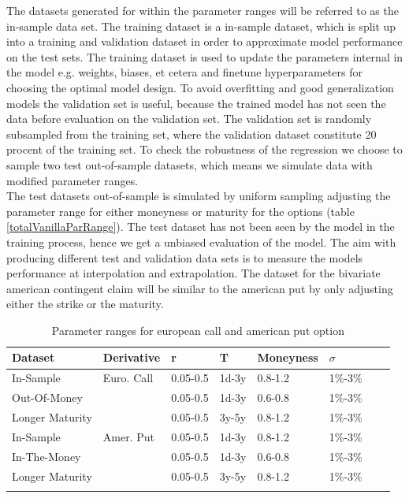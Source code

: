 The datasets generated for within the parameter ranges will be referred to as the in-sample data set. The training dataset is a in-sample dataset, which is split up into a training and validation dataset in order to approximate model performance on the test sets. The training dataset is used to update the parameters internal in the model e.g. weights, biases, et cetera and finetune hyperparameters for choosing the optimal model design. To avoid overfitting and good generalization models the validation set is useful, because the trained model has not seen the data before evaluation on the validation set. The validation set is randomly subsampled from the training set, where the validation dataset constitute 20 procent of the training set. To check the robustness of the regression we choose to sample two test out-of-sample datasets, which means we simulate data with modified parameter ranges. \\

The test datasets out-of-sample is simulated by uniform sampling adjusting the parameter range for either moneyness or maturity for the options (table \ref{totalVanillaParRange}). The test dataset has not been seen by the model in the training process, hence we get a unbiased evaluation of the model. The aim with producing different test and validation data sets is to measure the models performance at interpolation and extrapolation. The dataset for the bivariate american contingent claim will be similar to the american put by only adjusting either the strike or the maturity.\\

\begin{table}[th]
\caption{Parameter ranges for european call and american put option}
\label{tab:totalVanillaParRange}
\centering
\begin{tabular}{l l l l l l l l }
\toprule
\textbf{Dataset} & Derivative  & \textbf{r} & \textbf{T} & \textbf{Moneyness} & \textbf{$\sigma$} \\
\midrule
In-Sample & Euro. Call & 0.05-0.5 & 1d-3y & 0.8-1.2 & 1\%-3\%\\ 
Out-Of-Money & & 0.05-0.5 & 1d-3y & 0.6-0.8 & 1\%-3\%\\
Longer Maturity & & 0.05-0.5 & 3y-5y & 0.8-1.2 & 1\%-3\%\\
In-Sample & Amer. Put & 0.05-0.5 & 1d-3y & 0.8-1.2 & 1\%-3\%\\ 
In-The-Money & & 0.05-0.5 & 1d-3y & 0.6-0.8 & 1\%-3\%\\
Longer Maturity & & 0.05-0.5 & 3y-5y & 0.8-1.2 & 1\%-3\%\\
\bottomrule\\
\end{tabular}
\end{table}

